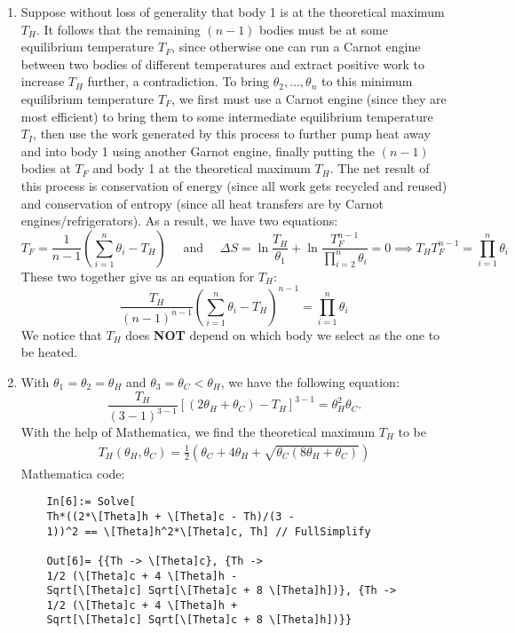 \documentclass{article}
\theoremstyle{definition}
\newcommand{\f}[2]{\frac{#1}{#2}}
\newcommand{\lp}{\left(}
\newcommand{\rp}{\right)}
\newcommand{\lb}{\left[}
\newcommand{\rb}{\right]}
\begin{document}
\begin{enumerate}[label=(\alph*)]
	\item Suppose without loss of generality that body 1 is at the theoretical maximum $T_H$. It follows that the remaining $(n-1)$ bodies must be at some equilibrium temperature $T_F$, since otherwise one can run a Carnot engine between two bodies of different temperatures and extract positive work to increase $T_H$ further, a contradiction. To bring $\theta_2,\dots, \theta_n$ to this minimum equilibrium temperature $T_F$, we first must use a Carnot engine (since they are most efficient) to bring them to some intermediate equilibrium temperature $T_I$, then use the work generated by this process to further pump heat away and into body 1 using another Garnot engine, finally putting the $(n-1)$ bodies at $T_F$ and body 1 at the theoretical maximum $T_H$. The net result of this process is conservation of energy (since all work gets recycled and reused) and conservation of entropy (since all heat transfers are by Carnot engines/refrigerators). As a result, we have two equations:
	\begin{equation*}
	\boxed{T_F = \f{1}{n-1}\lp \sum_{i=1}^n \theta_i - T_H\rp} \quad \text{ and } \quad \Delta S = \ln \f{T_H}{\theta_1} + \ln \f{T_F^{n-1}}{\prod_{i=2}^n \theta_i} = 0 \implies \boxed{T_H T_F^{n-1} = \prod_{i=1}^n \theta_i}
	\end{equation*}
	These two together give us an equation for $T_H$:
	\begin{equation*}
	\boxed{\f{T_H}{(n-1)^{n-1}} \lp \sum_{i=1}^n \theta_i - T_H \rp^{n-1} = \prod_{i=1}^n \theta_i }
	\end{equation*}
	We notice that $T_H$ does \textbf{NOT} depend on which body we select as the one to be heated. 
	
	
	\item With $\theta_1 = \theta_2 = \theta_H$ and $\theta_3 = \theta_C < \theta_H$, we have the following equation:
	\begin{equation*}
	\f{T_H}{(3-1)^{3-1}} \lb (2\theta_H + \theta_C) - T_H \rb^{3-1} = \theta_H^2 \theta_C.
	\end{equation*}
	With the help of Mathematica, we find the theoretical maximum $T_H$ to be 
	\begin{align*}
	\boxed{ T_H(\theta_H,\theta_C) = \f{1}{2} \lp \theta_C + 4\theta_H + \sqrt{\theta_C(8\theta_H + \theta_C)} \rp}
	\end{align*}
	Mathematica code:
	\begin{lstlisting}
	In[6]:= Solve[
	Th*((2*\[Theta]h + \[Theta]c - Th)/(3 - 
	1))^2 == \[Theta]h^2*\[Theta]c, Th] // FullSimplify
	
	Out[6]= {{Th -> \[Theta]c}, {Th -> 
	1/2 (\[Theta]c + 4 \[Theta]h - 
	Sqrt[\[Theta]c] Sqrt[\[Theta]c + 8 \[Theta]h])}, {Th -> 
	1/2 (\[Theta]c + 4 \[Theta]h + 
	Sqrt[\[Theta]c] Sqrt[\[Theta]c + 8 \[Theta]h])}}
	\end{lstlisting}
\end{enumerate}
\end{document}

